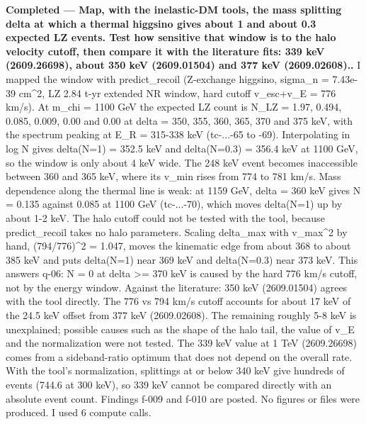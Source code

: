 \documentclass[11pt,a4paper]{article}
\begin{document}
\textbf{Completed --- Map, with the inelastic-DM tools, the mass splitting delta at which a thermal higgsino gives about 1 and about 0.3 expected LZ events. Test how sensitive that window is to the halo velocity cutoff, then compare it with the literature fits: 339 keV (2609.26698), about 350 keV (2609.01504) and 377 keV (2609.02608)..} I mapped the window with predict\_recoil (Z-exchange higgsino, sigma\_n = 7.43e-39 cm\textasciicircum{}2, LZ 2.84 t-yr extended NR window, hard cutoff v\_esc+v\_E = 776 km/s). At m\_chi = 1100 GeV the expected LZ count is N\_LZ = 1.97, 0.494, 0.085, 0.009, 0.00 and 0.00 at delta = 350, 355, 360, 365, 370 and 375 keV, with the spectrum peaking at E\_R = 315-338 keV (tc-...-65 to -69). Interpolating in log N gives delta(N=1) = 352.5 keV and delta(N=0.3) = 356.4 keV at 1100 GeV, so the window is only about 4 keV wide. The 248 keV event becomes inaccessible between 360 and 365 keV, where its v\_min rises from 774 to 781 km/s. Mass dependence along the thermal line is weak: at 1159 GeV, delta = 360 keV gives N = 0.135 against 0.085 at 1100 GeV (tc-...-70), which moves delta(N=1) up by about 1-2 keV. The halo cutoff could not be tested with the tool, because predict\_recoil takes no halo parameters. Scaling delta\_max with v\_max\textasciicircum{}2 by hand, (794/776)\textasciicircum{}2 = 1.047, moves the kinematic edge from about 368 to about 385 keV and puts delta(N=1) near 369 keV and delta(N=0.3) near 373 keV. This answers q-06: N = 0 at delta \textgreater{}= 370 keV is caused by the hard 776 km/s cutoff, not by the energy window. Against the literature: 350 keV (2609.01504) agrees with the tool directly. The 776 vs 794 km/s cutoff accounts for about 17 keV of the 24.5 keV offset from 377 keV (2609.02608). The remaining roughly 5-8 keV is unexplained; possible causes such as the shape of the halo tail, the value of v\_E and the normalization were not tested. The 339 keV value at 1 TeV (2609.26698) comes from a sideband-ratio optimum that does not depend on the overall rate. With the tool's normalization, splittings at or below 340 keV give hundreds of events (744.6 at 300 keV), so 339 keV cannot be compared directly with an absolute event count. Findings f-009 and f-010 are posted. No figures or files were produced. I used 6 compute calls.
\end{document}
